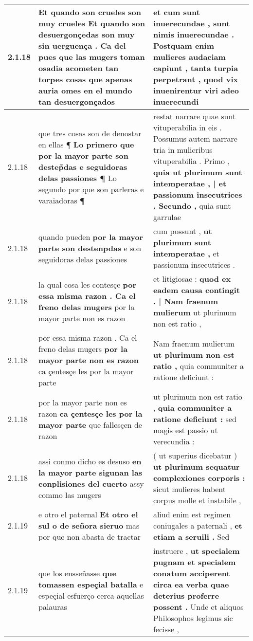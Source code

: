\begin{tabular}{|p{1cm}|p{6.5cm}|p{6.5cm}|}
2.1.18 & Et quando son crueles son muy crueles Et quando son desuergonçedas son muy sin uerguença . \textbf{ Ca del pues que las mugers toman osadia acometen tan torpes cosas } que apenas auria omes en el mundo tan desuergonçados & et cum sunt inuerecundae , sunt nimis inuerecundae . Postquam enim mulieres audaciam capiunt , \textbf{ tanta turpia perpetrant , } quod vix inuenirentur viri adeo inuerecundi \\\hline
2.1.18 & que tres cosas son de denostar en ellas ¶ \textbf{ Lo primero que por la mayor parte son destep̃das e seguidoras delas passiones ¶ } Lo segundo por que son parleras e varaiadoras ¶ & restat narrare quae sunt vituperabilia in eis . Possumus autem narrare tria in mulieribus vituperabilia . Primo , \textbf{ quia ut plurimum sunt intemperatae , | et passionum insecutrices . Secundo , } quia sunt garrulae \\\hline
2.1.18 & quando pueden \textbf{ por la mayor parte son destenpdas } e son seguidoras delas passiones & cum possunt , \textbf{ ut plurimum sunt intemperatae , } et passionum insecutrices . \\\hline
2.1.18 & la qual cosa les contesçe \textbf{ por essa misma razon . Ca el freno delas mugers } por la mayor parte non es razon & et litigiosae : \textbf{ quod ex eadem causa contingit . | Nam fraenum mulierum } ut plurimum non est ratio , \\\hline
2.1.18 & por essa misma razon . Ca el freno delas mugers \textbf{ por la mayor parte non es razon } ca çentesçe les por la mayor parte & Nam fraenum mulierum \textbf{ ut plurimum non est ratio , } quia communiter a ratione deficiunt : \\\hline
2.1.18 & por la mayor parte non es razon \textbf{ ca çentesçe les por la mayor parte } que fallesçen de razon & ut plurimum non est ratio , \textbf{ quia communiter a ratione deficiunt : } sed magis est passio ut verecundia : \\\hline
2.1.18 & assi conmo dicho es desuso \textbf{ en la mayor parte sigunan las conplisiones del cuerto } assy commo las mugers & ( ut superius dicebatur ) \textbf{ ut plurimum sequatur complexiones corporis : } sicut mulieres habent corpus molle et instabile , \\\hline
2.1.19 & e otro el paternal \textbf{ Et otro el sul o de señora sieruo } mas por que non abasta de tractar & aliud enim est regimen coniugales a paternali , \textbf{ et etiam a seruili . } Sed \\\hline
2.1.19 & que los ensseñasse \textbf{ que tomassen espeçial batalla } e espeçial esfuerço cerca aquellas palauras & instruere , \textbf{ ut specialem pugnam et specialem conatum acciperent circa ea verba quae deterius proferre possent . } Unde et aliquos Philosophos legimus sic fecisse , \\\hline

\end{tabular}
